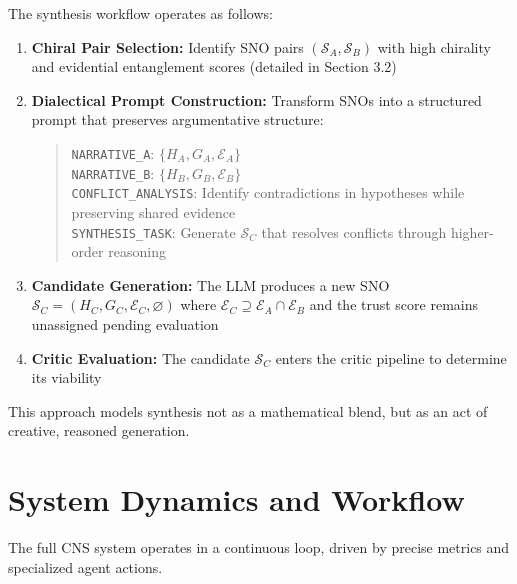 \documentclass[12pt, a4paper]{article}
\begin{document}
The synthesis workflow operates as follows:
\begin{enumerate}
    \item \textbf{Chiral Pair Selection:} Identify SNO pairs $(\mathcal{S}_A, \mathcal{S}_B)$ with high chirality and evidential entanglement scores (detailed in Section 3.2)
    
    \item \textbf{Dialectical Prompt Construction:} Transform SNOs into a structured prompt that preserves argumentative structure:
        \begin{quote}
        \texttt{NARRATIVE\_A}: $\{H_A, G_A, \mathcal{E}_A\}$ \\
        \texttt{NARRATIVE\_B}: $\{H_B, G_B, \mathcal{E}_B\}$ \\
        \texttt{CONFLICT\_ANALYSIS}: Identify contradictions in hypotheses while preserving shared evidence \\
        \texttt{SYNTHESIS\_TASK}: Generate $\mathcal{S}_C$ that resolves conflicts through higher-order reasoning
        \end{quote}
    
    \item \textbf{Candidate Generation:} The LLM produces a new SNO $\mathcal{S}_C = (H_C, G_C, \mathcal{E}_C, \varnothing)$ where $\mathcal{E}_C \supseteq \mathcal{E}_A \cap \mathcal{E}_B$ and the trust score remains unassigned pending evaluation
    
    \item \textbf{Critic Evaluation:} The candidate $\mathcal{S}_C$ enters the critic pipeline to determine its viability
\end{enumerate}
This approach models synthesis not as a mathematical blend, but as an act of creative, reasoned generation.

\section{System Dynamics and Workflow}
The full CNS system operates in a continuous loop, driven by precise metrics and specialized agent actions.
\end{document}
